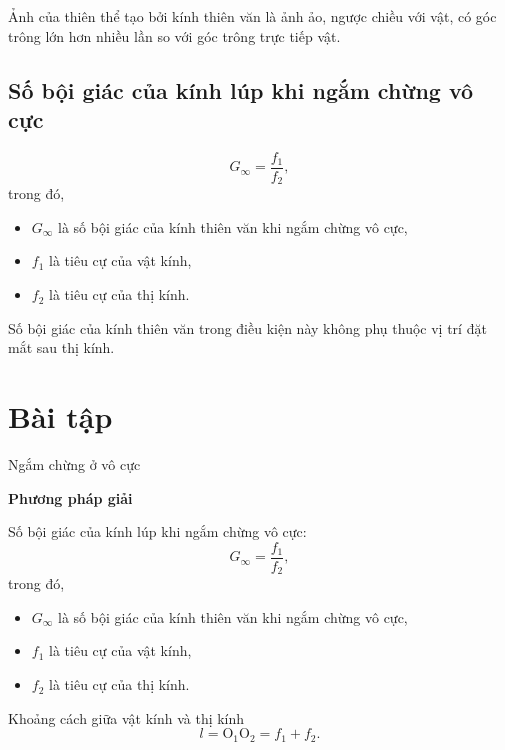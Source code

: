 Ảnh của thiên thể tạo bởi kính thiên văn là ảnh ảo, ngược chiều với vật, có góc trông lớn hơn nhiều lần so với góc trông trực tiếp vật.

\subsection{Số bội giác của kính lúp khi ngắm chừng vô cực}
\begin{equation}
G_\infty=\dfrac{f_1}{f_2},
\end{equation}
trong đó,
\begin{itemize}
	\item $G_\infty$ là số bội giác của kính thiên văn khi ngắm chừng vô cực,
	\item $f_1$ là tiêu cự của vật kính,
	\item $f_2$ là tiêu cự của thị kính. 
\end{itemize}
Số bội giác của kính thiên văn trong điều kiện này không phụ thuộc vị trí đặt mắt sau thị kính. 


\section{Bài tập }
\begin{dang}{Ngắm chừng ở vô cực}
\end{dang}
\textbf{Phương pháp giải}

Số bội giác của kính lúp khi ngắm chừng vô cực: 
\begin{equation}
G_\infty=\dfrac{f_1}{f_2},
\end{equation}
trong đó,
\begin{itemize}
	\item $G_\infty$ là số bội giác của kính thiên văn khi ngắm chừng vô cực,
	\item $f_1$ là tiêu cự của vật kính,
	\item $f_2$ là tiêu cự của thị kính. 
\end{itemize}
Khoảng cách giữa vật kính và thị kính $$l=\text{O}_1\text{O}_2=f_1+f_2.$$


